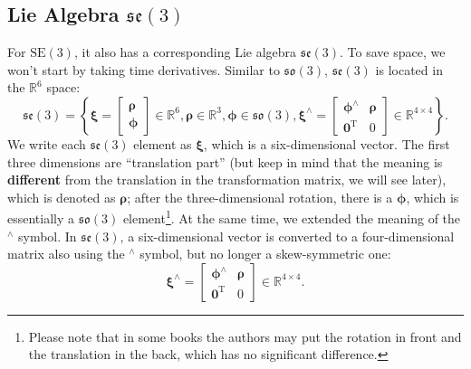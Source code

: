 \subsection{Lie Algebra $\mathfrak{se}(3)$}
For $\mathrm{SE}(3)$, it also has a corresponding Lie algebra $\mathfrak{se}(3)$. To save space, we won't start by taking time derivatives. Similar to $\mathfrak{so}(3)$, $\mathfrak{se}(3)$ is located in the $\mathbb{R}^6$ space:
\begin{equation}
\mathfrak{se}(3) = \left\{ { \boldsymbol{\xi} = \left[ \begin{array}{l}
    \boldsymbol{\rho} \\
    \boldsymbol{\phi}
    \end{array} \right]
    \in { \mathbb{R}^6} ,
    \boldsymbol{\rho} \in { \mathbb{R}^3}, \boldsymbol{\phi} \in \mathfrak{so} \left( 3 \right),{ \boldsymbol{\xi} ^ \wedge } = \left[ {\begin{array}{*{20}{c}}
        {{ \boldsymbol{\phi} ^ \wedge }}& \boldsymbol{\rho} \\
        {{\mathbf{0}^\mathrm{T}}}&0
        \end{array}} \right] \in { \mathbb{R}^{4 \times 4}}} \right\}.
\end{equation}
We write each $\mathfrak{se}(3)$ element as $\boldsymbol{\xi}$, which is a six-dimensional vector. The first three dimensions are ``translation part'' (but keep in mind that the meaning is \textbf{different} from the translation in the transformation matrix, we will see later), which is denoted as $\boldsymbol{\rho}$; after the three-dimensional rotation, there is a $\boldsymbol{\phi}$, which is essentially a $\mathfrak{so}(3)$ element\footnote{Please note that in some books the authors may put the rotation in front and the translation in the back, which has no significant difference.}. At the same time, we extended the meaning of the $^\wedge$ symbol. In $\mathfrak{se}(3)$, a six-dimensional vector is converted to a four-dimensional matrix also using the $^\wedge$ symbol, but no longer a skew-symmetric one:
\begin{equation}
{ \boldsymbol{\xi} ^ \wedge } = \left[ {\begin{array}{*{20}{c}}
    {{ \boldsymbol{\phi} ^ \wedge }}& \boldsymbol{\rho} \\
    {{\mathbf{0}^\mathrm{T}}}&0
    \end{array}} \right] \in { \mathbb{R}^{4 \times 4}}.
\end{equation}


